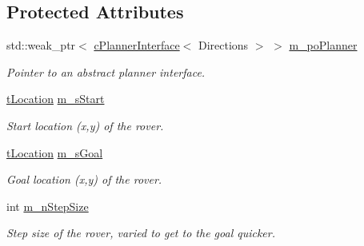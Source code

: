 \subsection*{Protected Attributes}
\begin{DoxyCompactItemize}
\item 
std\+::weak\+\_\+ptr$<$ \mbox{\hyperlink{classplanner_1_1c_planner_interface}{c\+Planner\+Interface}}$<$ Directions $>$ $>$ \mbox{\hyperlink{classplanner_1_1c_rover_interface_af2922d392a98ab42a3f8e706851a4813}{m\+\_\+po\+Planner}}
\begin{DoxyCompactList}\small\item\em Pointer to an abstract planner interface. \end{DoxyCompactList}\item 
\mbox{\label{classplanner_1_1c_rover_interface_a42552f6e5f1f2909821eaef8535a9979}} 
\mbox{\hyperlink{structplanner_1_1t_location}{t\+Location}} \mbox{\hyperlink{classplanner_1_1c_rover_interface_a42552f6e5f1f2909821eaef8535a9979}{m\+\_\+s\+Start}}
\begin{DoxyCompactList}\small\item\em Start location (x,y) of the rover. \end{DoxyCompactList}\item 
\mbox{\label{classplanner_1_1c_rover_interface_a705221124f88ca9dbdf706869ebfc96a}} 
\mbox{\hyperlink{structplanner_1_1t_location}{t\+Location}} \mbox{\hyperlink{classplanner_1_1c_rover_interface_a705221124f88ca9dbdf706869ebfc96a}{m\+\_\+s\+Goal}}
\begin{DoxyCompactList}\small\item\em Goal location (x,y) of the rover. \end{DoxyCompactList}\item 
\mbox{\label{classplanner_1_1c_rover_interface_aea86540c3962e223de84f28ff067d788}} 
int \mbox{\hyperlink{classplanner_1_1c_rover_interface_aea86540c3962e223de84f28ff067d788}{m\+\_\+n\+Step\+Size}}
\begin{DoxyCompactList}\small\item\em Step size of the rover, varied to get to the goal quicker. \end{DoxyCompactList}\item 
\mbox{\label{classplanner_1_1c_rover_interface_a458f3e469a13cfc909e957678ddee753}} 

\end{DoxyCompactItemize}
